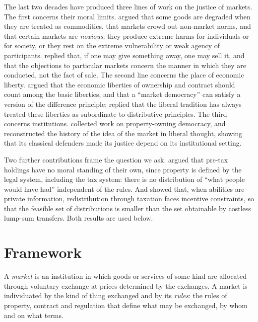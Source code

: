 \documentclass{situationist-preprint}
\begin{document}
The last two decades have produced three lines of work on the justice of markets. The first concerns their moral limits. \citet{Anderson1993} argued that some goods are degraded when they are treated as commodities, \citet{Sandel2012} that markets crowd out non-market norms, and \citet{Satz2010} that certain markets are \emph{noxious}: they produce extreme harms for individuals or for society, or they rest on the extreme vulnerability or weak agency of participants. \citet{BrennanJaworski2016} replied that, if one may give something away, one may sell it, and that the objections to particular markets concern the manner in which they are conducted, not the fact of sale. The second line concerns the place of economic liberty. \citet{Tomasi2012} argued that the economic liberties of ownership and contract should count among the basic liberties, and that a \enquote{market democracy} can satisfy a version of the difference principle; \citet{Freeman2011} replied that the liberal tradition has always treated these liberties as subordinate to distributive principles. The third concerns institutions. \citet{ONeillWilliamson2012} collected work on property-owning democracy, and \citet{Herzog2013} reconstructed the history of the idea of the market in liberal thought, showing that its classical defenders made its justice depend on its institutional setting.

Two further contributions frame the question we ask. \citet{MurphyNagel2002} argued that pre-tax holdings have no moral standing of their own, since property is defined by the legal system, including the tax system: there is no distribution of \enquote{what people would have had} independent of the rules. And \citet{Mirrlees1971} showed that, when abilities are private information, redistribution through taxation faces incentive constraints, so that the feasible set of distributions is smaller than the set obtainable by costless lump-sum transfers. Both results are used below.

\section{Framework}

\begin{definition}\label{d:market}
A \emph{market} is an institution in which goods or services of some kind are allocated through voluntary exchange at prices determined by the exchanges. A market is individuated by the kind of thing exchanged and by its \emph{rules}: the rules of property, contract and regulation that define what may be exchanged, by whom and on what terms.
\end{definition}
\end{document}

